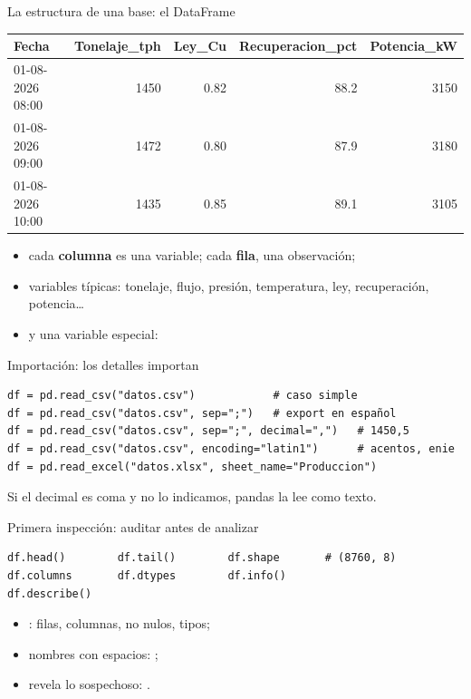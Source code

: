 \begin{frame}{La estructura de una base: el DataFrame}
\begin{center}
\begin{tabular}{lrrrr}
\toprule
Fecha & Tonelaje\_tph & Ley\_Cu & Recuperacion\_pct & Potencia\_kW\\
\midrule
01-08-2026 08:00 & 1450 & 0.82 & 88.2 & 3150\\
01-08-2026 09:00 & 1472 & 0.80 & 87.9 & 3180\\
01-08-2026 10:00 & 1435 & 0.85 & 89.1 & 3105\\
\bottomrule
\end{tabular}
\end{center}
\begin{itemize}
  \item cada \textbf{columna} es una variable; cada \textbf{fila}, una observación;
  \item variables típicas: tonelaje, flujo, presión, temperatura, ley, recuperación, potencia\ldots
  \item y una variable especial: 
\end{itemize}
\end{frame}

\begin{frame}[fragile]{Importación: los detalles importan}
\begin{lstlisting}
df = pd.read_csv("datos.csv")            # caso simple
df = pd.read_csv("datos.csv", sep=";")   # export en español
df = pd.read_csv("datos.csv", sep=";", decimal=",")   # 1450,5
df = pd.read_csv("datos.csv", encoding="latin1")      # acentos, enie
df = pd.read_excel("datos.xlsx", sheet_name="Produccion")
\end{lstlisting}
\vfill
{}
Si el decimal es coma y no lo indicamos, pandas la lee como texto.
\end{frame}

\begin{frame}[fragile]{Primera inspección: auditar antes de analizar}
\begin{lstlisting}
df.head()        df.tail()        df.shape       # (8760, 8)
df.columns       df.dtypes        df.info()
df.describe()
\end{lstlisting}
\begin{itemize}
  \item {}: filas, columnas, no nulos, tipos;
  \item nombres con espacios: ;
  \item {} revela lo sospechoso: .
\end{itemize}
\end{frame}

